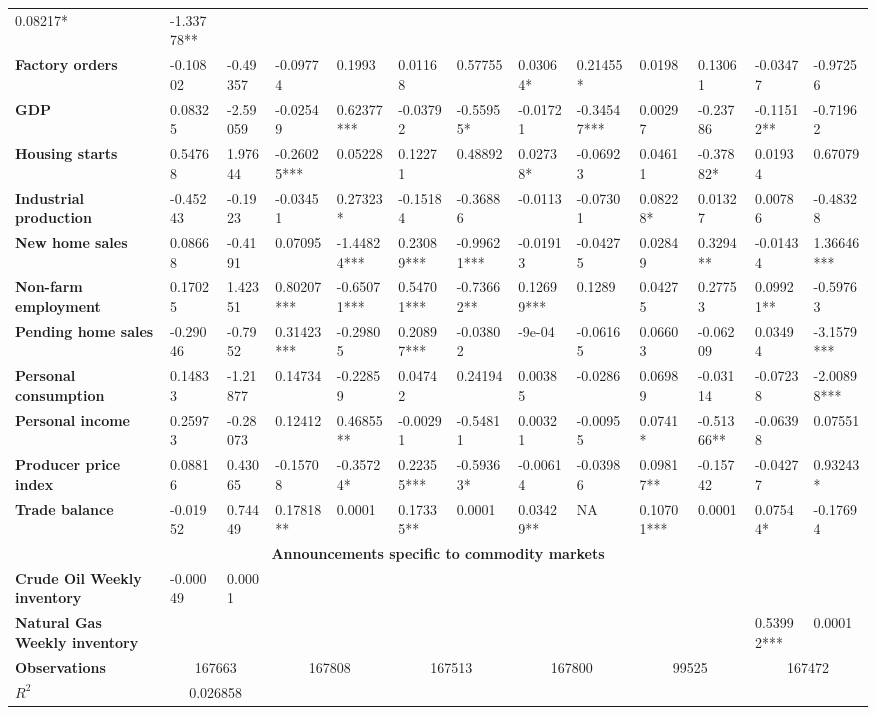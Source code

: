 \begin{sidewaystable}
{\begin{tabular}{@{}lllllllllllll@{}}
0.08217* & -1.33778** \\ \textbf{Factory orders}& -0.10802 & -0.49357 & -0.09774 & 0.1993 & 0.01168 & 0.57755 & 0.03064* & 0.21455* & 0.0198 & 0.13061 & -0.03477 & -0.97256 \\ \textbf{GDP}& 0.08325 & -2.59059 & -0.02549 & 0.62377*** & -0.03792 & -0.55955* & -0.01721 & -0.34547*** & 0.00297 & -0.23786 & -0.11512** & -0.71962 \\ \textbf{Housing starts}& 0.54768 & 1.97644 & -0.26025*** & 0.05228 & 0.12271 & 0.48892 & 0.02738* & -0.06923 & 0.04611 & -0.37882* & 0.01934 & 0.67079 \\ \textbf{Industrial production}& -0.45243 & -0.1923 & -0.03451 & 0.27323* & -0.15184 & -0.36886 & -0.0113 & -0.07301 & 0.08228* & 0.01327 & 0.00786 & -0.48328 \\ \textbf{New home sales}& 0.08668 & -0.4191 & 0.07095 & -1.44824*** & 0.23089*** & -0.99621*** & -0.01913 & -0.04275 & 0.02849 & 0.3294** & -0.01434 & 1.36646*** \\ \textbf{Non-farm employment}& 0.17025 & 1.42351 & 0.80207*** & -0.65071*** & 0.54701*** & -0.73662** & 0.12699*** & 0.1289 & 0.04275 & 0.27753 & 0.09921** & -0.59763 \\ \textbf{Pending home sales}& -0.29046 & -0.7952 & 0.31423*** & -0.29805 & 0.20897*** & -0.03802 & -9e-04 & -0.06165 & 0.06603 & -0.06209 & 0.03494 & -3.1579*** \\ \textbf{Personal consumption}& 0.14833 & -1.21877 & 0.14734 & -0.22859 & 0.04742 & 0.24194 & 0.00385 & -0.0286 & 0.06989 & -0.03114 & -0.07238 & -2.00898*** \\ \textbf{Personal income}& 0.25973 & -0.28073 & 0.12412 & 0.46855** & -0.00291 & -0.54811 & 0.00321 & -0.00955 & 0.0741* & -0.51366** & -0.06398 & 0.07551 \\ \textbf{Producer price index}& 0.08816 & 0.43065 & -0.15708 & -0.35724* & 0.22355*** & -0.59363* & -0.00614 & -0.03986 & 0.09817** & -0.15742 & -0.04277 & 0.93243* \\ \textbf{Trade balance}& -0.01952 & 0.74449 & 0.17818** & 0.0001& 0.17335** & 0.0001& 0.03429** & NA & 0.10701*** & 0.0001& 0.07544* & -0.17694 \\  \midrule \multicolumn{13}{c}{\textbf{Announcements specific to commodity markets}} \\ \midrule \textbf{Crude Oil Weekly inventory}& -0.00049 & 0.0001&  &  &  &  &  &  &  &  &  &  \\ \textbf{Natural Gas Weekly inventory}&  &  &  &  &  &  &  &  &  &  & 0.53992*** & 0.0001\\  \midrule \textbf{Observations}             &\multicolumn{2}{c}{ 167663 }                                                 & \multicolumn{2}{c}{ 167808 }                                                 & \multicolumn{2}{c}{ 167513 }                                                 & \multicolumn{2}{c}{ 167800 }                                                 & \multicolumn{2}{c}{ 99525 }                                                   & \multicolumn{2}{c}{ 167472 }                                                 \\ \textbf{$R^2$}             &\multicolumn{2}{c}{ 0.026858 }     
\end{tabular}}
\end{sidewaystable}
